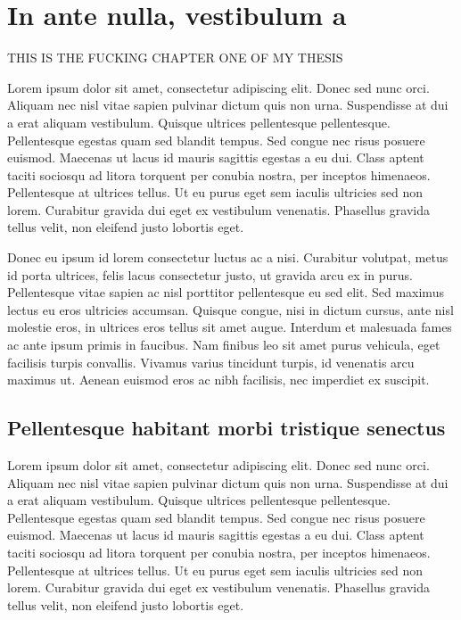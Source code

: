 \chapter{In ante nulla, vestibulum a}
\label{cha:intro}

THIS IS THE FUCKING CHAPTER ONE OF MY THESIS

Lorem ipsum dolor sit amet, consectetur adipiscing elit. Donec sed nunc orci. Aliquam nec nisl vitae sapien pulvinar dictum quis non urna. Suspendisse at dui a erat aliquam vestibulum. Quisque ultrices pellentesque pellentesque. Pellentesque egestas quam sed blandit tempus. Sed congue nec risus posuere euismod. Maecenas ut lacus id mauris sagittis egestas a eu dui. Class aptent taciti sociosqu ad litora torquent per conubia nostra, per inceptos himenaeos. Pellentesque at ultrices tellus. Ut eu purus eget sem iaculis ultricies sed non lorem. Curabitur gravida dui eget ex vestibulum venenatis. Phasellus gravida tellus velit, non eleifend justo lobortis eget. 
\cite{coulouris}

Donec eu ipsum id lorem consectetur luctus ac a nisi. Curabitur volutpat, metus id porta ultrices, felis lacus consectetur justo, ut gravida arcu ex in purus. Pellentesque vitae sapien ac nisl porttitor pellentesque eu sed elit. Sed maximus lectus eu eros ultricies accumsan. Quisque congue, nisi in dictum cursus, ante nisl molestie eros, in ultrices eros tellus sit amet augue. Interdum et malesuada fames ac ante ipsum primis in faucibus. Nam finibus leo sit amet purus vehicula, eget facilisis turpis convallis. Vivamus varius tincidunt turpis, id venenatis arcu maximus ut. Aenean euismod eros ac nibh facilisis, nec imperdiet ex suscipit.
\cite{dalal}


\section{Pellentesque habitant morbi tristique senectus}
\label{sec:context}

Lorem ipsum dolor sit amet, consectetur adipiscing elit. Donec sed nunc orci. Aliquam nec nisl vitae sapien pulvinar dictum quis non urna. Suspendisse at dui a erat aliquam vestibulum. Quisque ultrices pellentesque pellentesque. Pellentesque egestas quam sed blandit tempus. Sed congue nec risus posuere euismod. Maecenas ut lacus id mauris sagittis egestas a eu dui. Class aptent taciti sociosqu ad litora torquent per conubia nostra, per inceptos himenaeos. Pellentesque at ultrices tellus. Ut eu purus eget sem iaculis ultricies sed non lorem. Curabitur gravida dui eget ex vestibulum venenatis. Phasellus gravida tellus velit, non eleifend justo lobortis eget.
\cite{ictbusiness}
\cite{donoho}

